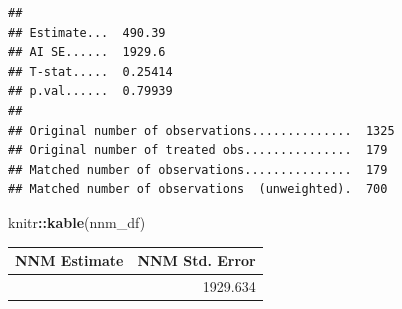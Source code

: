 \documentclass[
]{article}
\newenvironment{Shaded}{\begin{snugshade}}{\end{snugshade}}
\newcommand{\AttributeTok}[1]{\textcolor[rgb]{0.13,0.29,0.53}{#1}}
\newcommand{\DecValTok}[1]{\textcolor[rgb]{0.00,0.00,0.81}{#1}}
\newcommand{\FunctionTok}[1]{\textcolor[rgb]{0.13,0.29,0.53}{\textbf{#1}}}
\newcommand{\NormalTok}[1]{#1}
\newcommand{\OtherTok}[1]{\textcolor[rgb]{0.56,0.35,0.01}{#1}}
\newcommand{\SpecialCharTok}[1]{\textcolor[rgb]{0.81,0.36,0.00}{\textbf{#1}}}
\newcommand{\StringTok}[1]{\textcolor[rgb]{0.31,0.60,0.02}{#1}}
\begin{document}
\begin{Shaded}
\end{Shaded}

\begin{verbatim}
## 
## Estimate...  490.39 
## AI SE......  1929.6 
## T-stat.....  0.25414 
## p.val......  0.79939 
## 
## Original number of observations..............  1325 
## Original number of treated obs...............  179 
## Matched number of observations...............  179 
## Matched number of observations  (unweighted).  700
\end{verbatim}

\begin{Shaded}
\begin{Highlighting}[]
\NormalTok{knitr}\SpecialCharTok{::}\FunctionTok{kable}\NormalTok{(nnm\_df)}
\end{Highlighting}
\end{Shaded}

\begin{longtable}[]{@{}rr@{}}
\toprule\noalign{}
NNM Estimate & NNM Std. Error \\
\midrule\noalign{}
\endhead
\bottomrule\noalign{}
\endlastfoot
490.3947 & 1929.634 \\
\end{longtable}
\end{document}
